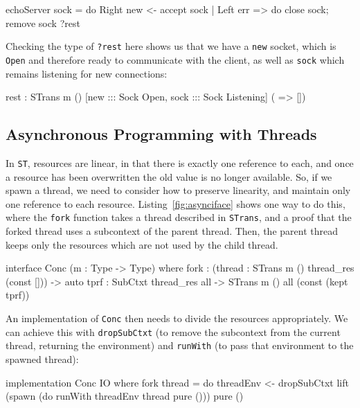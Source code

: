 \small
\begin{code}
echoServer sock = 
  do Right new <- accept sock | Left err => do close sock; remove sock
     ?rest
\end{code}
\normalsize

Checking the type of \texttt{?rest} here shows us that we have a 
\texttt{new} socket, which is \texttt{Open} and therefore ready to communicate
with the client, as well as \texttt{sock} which remains listening for new
connections:

\small
\begin{code}
rest : STrans m () [new ::: Sock Open, sock ::: Sock Listening]
                   ( => [])
\end{code}
\normalsize

\subsection{Asynchronous Programming with Threads}

\label{sect:async}

In \texttt{ST}, resources are linear, in that there is exactly one reference
to each, and once a resource has been overwritten the old value is no longer
available. So, if we spawn a thread, we need to consider how to preserve
linearity, and maintain only one reference to each resource.
Listing~\ref{fig:asynciface} shows one way to do this, where the
\texttt{fork} function takes a thread described in \texttt{STrans}, and
a proof that the forked thread uses a subcontext of the parent thread.
Then, the parent thread keeps only the resources which are not used by
the child thread.

\small
\begin{code}[float=h, frame=single,caption={An interface supporting
asynchronous programming, dividing resources between a child
and a parent thread},
label=fig:asynciface]
interface Conc (m : Type -> Type) where
  fork : (thread : STrans m () thread_res (const [])) ->
         {auto tprf : SubCtxt thread_res all} ->
         STrans m () all (const (kept tprf)) 
\end{code}
\normalsize

An implementation of \texttt{Conc} then needs to divide the resources
appropriately. We can achieve this with \texttt{dropSubCtxt} (to remove
the subcontext from the current thread, returning the environment) and
\texttt{runWith} (to pass that environment to the spawned thread):

\small
\begin{code}
implementation Conc IO where
  fork thread = do threadEnv <- dropSubCtxt
                   lift (spawn (do runWith threadEnv thread
                                   pure ()))
                   pure ()

\end{code}
\normalsize

